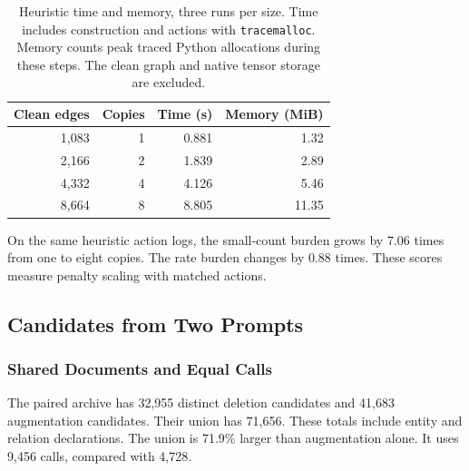 \begin{table}[t]

\centering

\caption{Heuristic time and memory, three runs per size. Time includes construction and actions with \texttt{tracemalloc}. Memory counts peak traced Python allocations during these steps. The clean graph and native tensor storage are excluded.}

\label{tab:scale_resources}

\scriptsize

\begin{tabular}{rrrr}

\toprule

Clean edges & Copies & Time (s) & Memory (MiB) \\

\midrule

1,083 & 1 & 0.881 & 1.32 \\

2,166 & 2 & 1.839 & 2.89 \\

4,332 & 4 & 4.126 & 5.46 \\

8,664 & 8 & 8.805 & 11.35 \\

\bottomrule

\end{tabular}

\end{table}

On the same heuristic action logs, the small-count burden grows by
7.06 times from one to eight copies. The rate burden changes by
0.88 times. These scores measure penalty scaling with matched actions.


\subsection{Candidates from Two Prompts}

\label{subsubsec:dual_strategy_ablation}

\subsubsection{Shared Documents and Equal Calls}

The paired archive has 32,955 distinct deletion candidates and 41,683
augmentation candidates. Their union has 71,656. These totals include
entity and relation declarations. The union is 71.9\% larger than
augmentation alone. It uses 9,456 calls, compared with 4,728.

